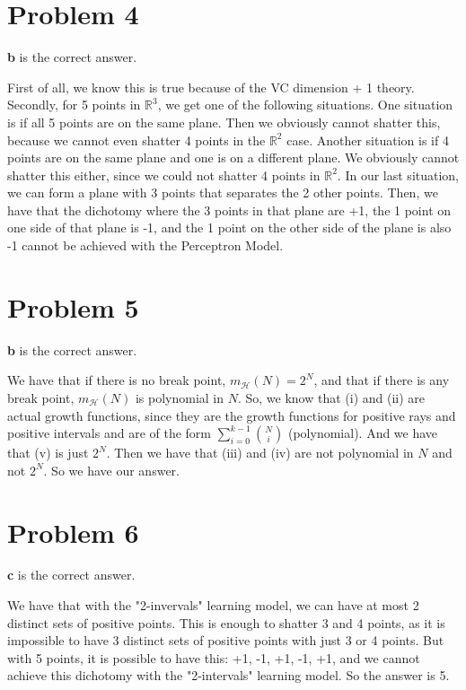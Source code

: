 \documentclass{article}
\begin{document}
\section*{Problem 4}
\textbf{b} is the correct answer.

\noindent First of all, we know this is true because of the VC dimension + 1
theory. Secondly, for 5 points in $\mathbb{R}^3$, we get one of the following
situations. One situation is if all 5 points are on the same plane. Then
we obviously cannot shatter this, because we cannot even shatter 4 points in the
$\mathbb{R}^2$ case. Another situation is if 4 points are on the same plane
and one is on a different plane. We obviously cannot shatter this either,
since we could not shatter 4 points in $\mathbb{R}^2$.
In our last situation, we can form a plane with 3 points that separates the
2 other points. Then, we have that the dichotomy where the 3 points in that
plane are +1, the 1 point on one side of that plane is -1, and the 1 point on
the other side of the plane is also -1 cannot be achieved with the Perceptron Model.
\section*{Problem 5}
\textbf{b} is the correct answer.

\noindent We have that if there is no break point, $m_{\mathcal{H}}(N) = 2^N$,
and that if there is any break point, $m_{\mathcal{H}}(N)$ is polynomial in $N$.
So, we know that (i) and (ii) are actual growth functions, since they are
the growth functions for positive rays and positive intervals and are of the
form $\sum_{i=0}^{k-1}\binom{N}{i}$ (polynomial). And we have that (v) is just
$2^N$. Then we have that (iii) and (iv) are not polynomial in $N$ and not $2^N$.
So we have our answer.
\section*{Problem 6}
\textbf{c} is the correct answer.

\noindent We have that with the "2-invervals" learning model, we can have at
most 2 distinct sets of positive points. This is enough to shatter 3 and 4 points,
as it is impossible to have 3 distinct sets of positive points with just
3 or 4 points. But with 5 points, it is possible to have this: +1, -1, +1, -1,
+1, and we cannot achieve this dichotomy with the "2-intervals" learning
model. So the answer is 5.
\end{document}
